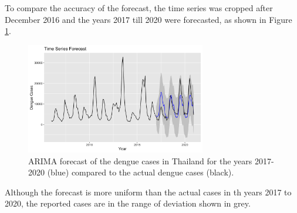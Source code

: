 	To compare the accuracy of the forecast, the time series was cropped after December 2016 and the years 2017 till 2020 were forecasted, as shown in Figure \ref{fig:Auto_ARIMA_2016}. 
		\begin{figure}[hbpt] 
		\centering
		\includegraphics[width=0.7\textwidth]{fig/Auto_ARIMA_2016.png}
		\caption{ARIMA forecast of the dengue cases in Thailand for the years 2017-2020 (blue) compared to the actual dengue cases (black).}
		\label{fig:Auto_ARIMA_2016}
	\end{figure}

Although the forecast is more uniform than the actual cases in th years 2017 to 2020, the reported cases are in the range of deviation shown in grey. 
	